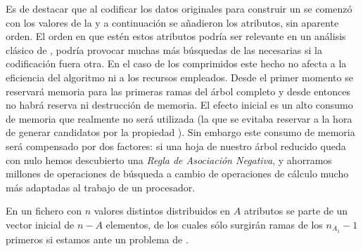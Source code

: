 Es de destacar que al codificar los datos originales para construir un \catalogo se comenzó con los valores de la \clase y a continuación se añadieron los atributos, sin aparente orden. El orden en que estén estos atributos podría ser relevante en un análisis clásico de \arm, podría provocar muchas más búsquedas de las necesarias si la codificación fuera otra. En el caso de los \catalogos comprimidos este hecho no afecta a la eficiencia del algoritmo ni a los recursos empleados. Desde el primer momento se reservará memoria para las primeras ramas del árbol \aprioriL completo y desde entonces no habrá reserva ni destrucción de memoria. El efecto inicial es un alto consumo de memoria que realmente no será utilizada (la que se evitaba reservar a la hora de generar candidatos por la propiedad \apriori). Sin embargo este consumo de memoria será compensado por dos factores: si una hoja de nuestro árbol \aprioriL reducido queda con \soporte nulo hemos descubierto una \emph{Regla de Asociación Negativa}, y ahorramos millones de operaciones de búsqueda a cambio de operaciones de cálculo mucho más adaptadas al trabajo de un procesador.




















En un fichero con $n$ valores distintos distribuidos en $A$ atributos se parte de un vector inicial de $n - A$ elementos, de los cuales sólo surgirán ramas de los $n_{A_1} - 1$ primeros si estamos ante un problema de \clasificacion.
